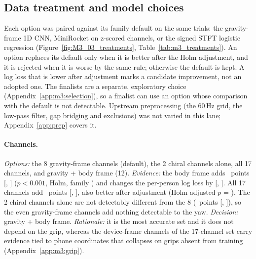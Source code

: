 \subsection{Data treatment and model choices}\label{app:m3:treatments}

Each option was paired against its family default on the same trials: the gravity-frame 1D CNN, MiniRocket on z-scored channels, or the signed STFT logistic regression (Figure~\ref{fig:M3_03_treatments}, Table~\ref{tab:m3_treatments}).
An option replaces its default only when it is better after the Holm adjustment, and it is rejected when it is worse by the same rule; otherwise the default is kept.
A log loss that is lower after adjustment marks a candidate improvement, not an adopted one.
The finalists are a separate, exploratory choice (Appendix~\ref{app:m3:selection}), so a finalist can use an option whose comparison with the default is not detectable.
Upstream preprocessing (the 60\,Hz grid, the low-pass filter, gap bridging and exclusions) was not varied in this lane; Appendix~\ref{app:prep} covers it.

\paragraph{Channels.}
\emph{Options:} the 8 gravity-frame channels (default), the 2 chiral channels alone, all 17 channels, and gravity + body frame (12).
\emph{Evidence:} the body frame adds ~points [, ] ($p < 0.001$, Holm, family ) and changes the per-person log loss by  [, ].
All 17 channels add ~points [, ], also better after adjustment (Holm-adjusted $p$ = ).
The 2 chiral channels alone are not detectably different from the 8 (~points [, ]), so the even gravity-frame channels add nothing detectable to the yaw.
\emph{Decision:} gravity + body frame.
\emph{Rationale:} it is the most accurate set and it does not depend on the grip, whereas the device-frame channels of the 17-channel set carry evidence tied to phone coordinates that collapses on grips absent from training (Appendix~\ref{app:m3:grip}).

